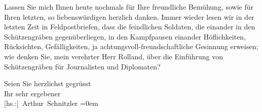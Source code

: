 \pstart
           Lassen Sie mich Ihnen heute nochmals für Ihre freundliche Bemühung, sowie für Ihren
               {\pb}letzten, so liebenswürdigen \label{K_L03885-2v}\label{K_L03885-2} herzlich danken. Immer
               wieder lesen wir in der letzten Zeit in Feldpostbriefen, dass die feindlichen
               Soldaten, die einander in den Schützengräben gegenüberliegen, in den Kampfpausen
               einander Höflichkeiten, Rücksichten, Gefälligkeiten, ja
               achtungsvoll-freundschaftliche Gesinnung erweisen\introOben{};\introOben{} wie
               denken Sie, mein verehrter Herr Rolland, über die Einführung von Schützengräben für
               Journalisten und Diplomaten?\pend
           
\pstart
           Seien Sie herzlichst gegrüsst{\\[\baselineskip]}Ihr sehr
                  ergebener{\\[\baselineskip]}\spacefill\mbox{{[}hs.:{]} Arthur Schnitzler}\pend
           \leftskip=0em{}\endnumbering{}
\begin{anhang}
\end{anhang}\newcommand{\dateiname}{L03885}\newcommand{\titel}{Arthur Schnitzler an Romain Rolland, 7. 1. 1915}\newcommand{\editorInnen}{Selma Jahnke und Martin Anton Müller}
